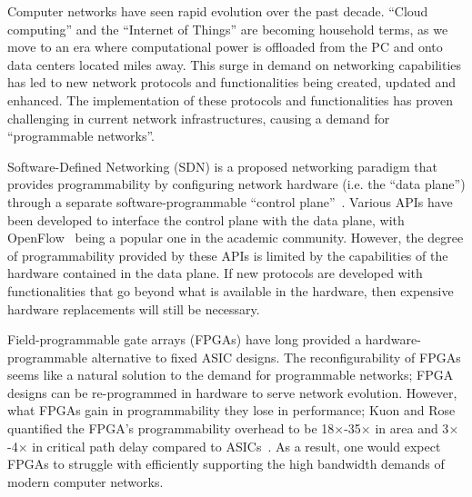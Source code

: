 %
%

Computer networks have seen rapid evolution over the past decade. 
``Cloud computing'' and the ``Internet of Things'' are becoming household terms, as we move to an era where computational power is offloaded from the PC and onto data centers located miles away.
This surge in demand on networking capabilities has led to new network protocols and functionalities being created, updated and enhanced.
The implementation of these protocols and functionalities has proven challenging in current network infrastructures, causing a demand for ``programmable networks''.

Software-Defined Networking (SDN) is a proposed networking paradigm that provides programmability by configuring network hardware (i.e. the ``data plane'') through a separate software-programmable ``control plane''~\cite{nunes2014survey}.
Various APIs have been developed to interface the control plane with the data plane, with OpenFlow~\cite{mckeown2008openflow} being a popular one in the academic community.
However, the degree of programmability provided by these APIs is limited by the capabilities of the hardware contained in the data plane.
If new protocols are developed with functionalities that go beyond what is available in the hardware, then expensive hardware replacements will still be necessary.

Field-programmable gate arrays (FPGAs) have long provided a hardware-programmable alternative to fixed ASIC designs.
The reconfigurability of FPGAs seems like a natural solution to the demand for programmable networks; FPGA designs can be re-programmed in hardware to serve network evolution.
However, what FPGAs gain in programmability they lose in performance; Kuon and Rose quantified the FPGA's programmability overhead to be 18$\times$-35$\times$ in area and 3$\times$-4$\times$ in critical path delay compared to ASICs~\cite{kuon2007measuring}.
As a result, one would expect FPGAs to struggle with efficiently supporting the high bandwidth demands of modern computer networks.

